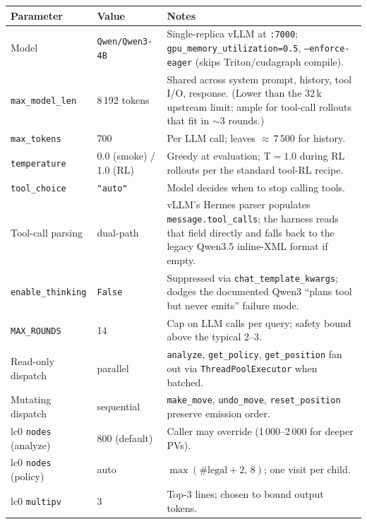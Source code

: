 \begin{tcolorbox}[notebox, title={Inference Configuration}]
\renewcommand{\arraystretch}{1.15}
\begin{tabular}{@{}p{3.4cm}p{2.8cm}p{8cm}@{}}
  \toprule
  \textbf{Parameter} & \textbf{Value} & \textbf{Notes} \\
  \midrule
  Model & \texttt{Qwen/Qwen3-4B} & Single-replica vLLM at \texttt{:7000}; \texttt{gpu\_memory\_utilization=0.5}, \texttt{--enforce-eager} (skips Triton/cudagraph compile). \\
  \texttt{max\_model\_len}   & 8\,192 tokens & Shared across system prompt, history, tool I/O, response. (Lower than the 32\,k upstream limit; ample for tool-call rollouts that fit in $\sim$3 rounds.) \\
  \texttt{max\_tokens}        & 700           & Per LLM call; leaves ${\approx}\,7\,500$ for history. \\
  \texttt{temperature}        & 0.0 (smoke) / 1.0 (RL) & Greedy at evaluation; T${=}1.0$ during RL rollouts per the standard tool-RL recipe. \\
  \texttt{tool\_choice}       & \texttt{"auto"} & Model decides when to stop calling tools. \\
  Tool-call parsing            & dual-path    & vLLM's Hermes parser populates \texttt{message.tool\_calls}; the harness reads that field directly and falls back to the legacy Qwen3.5 inline-XML format if empty. \\
  \texttt{enable\_thinking}   & \texttt{False} & Suppressed via \texttt{chat\_template\_kwargs}; dodges the documented Qwen3 ``plans tool but never emits'' failure mode. \\
  \texttt{MAX\_ROUNDS}        & 14            & Cap on LLM calls per query; safety bound above the typical 2--3. \\
  Read-only dispatch          & parallel      & \texttt{analyze}, \texttt{get\_policy}, \texttt{get\_position} fan out via \texttt{ThreadPoolExecutor} when batched. \\
  Mutating dispatch           & sequential    & \texttt{make\_move}, \texttt{undo\_move}, \texttt{reset\_position} preserve emission order. \\
  lc0 \texttt{nodes} (analyze)& 800 (default) & Caller may override (1\,000--2\,000 for deeper PVs). \\
  lc0 \texttt{nodes} (policy) & auto          & $\max(\#\text{legal}+2,\,8)$; one visit per child. \\
  lc0 \texttt{multipv}        & 3             & Top-3 lines; chosen to bound output tokens. \\
  \bottomrule
\end{tabular}
\end{tcolorbox}

